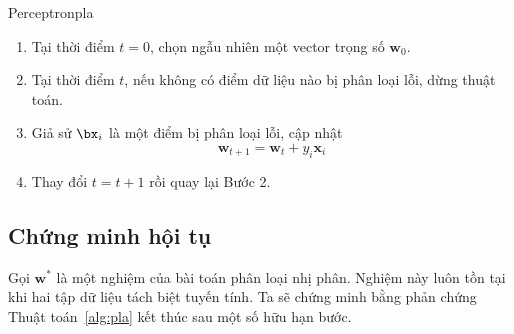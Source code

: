  
\begin{myalg}{Perceptron}{pla}
\begin{enumerate}
    \item Tại thời điểm $t = 0$, chọn ngẫu nhiên một vector trọng số $\mathbf{w}_0$.

    \item Tại thời điểm $t$, nếu không có điểm dữ liệu nào bị phân loại lỗi, dừng thuật toán. 

    \item Giả sử $\bx_i$ là một điểm bị phân loại lỗi, cập nhật
        \begin{equation} 
        \nonumber
        \mathbf{w}_{t+1} = \mathbf{w}_t + y_i\mathbf{x}_i 
        \end{equation} 

    \item Thay đổi $t = t + 1$ rồi quay lại Bước 2.
\end{enumerate}
\end{myalg}

 
\subsection{Chứng minh hội tụ}
 
Gọi $\mathbf{w}^*$ là một nghiệm của bài toán phân loại nhị phân. Nghiệm này luôn tồn tại khi hai tập dữ liệu tách biệt tuyến tính. Ta sẽ chứng minh bằng phản chứng Thuật toán~\ref{alg:pla} kết thúc sau một số hữu hạn bước. 

